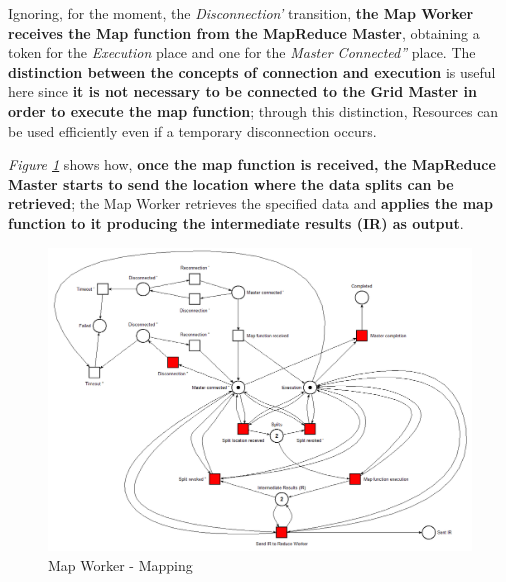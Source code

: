 Ignoring, for the moment, the \textit{Disconnection'} transition, \textbf{the Map Worker receives the Map function from the MapReduce Master}, obtaining a token for the \textit{Execution} place and one for the \textit{Master Connected''} place. The \textbf{distinction between the concepts of connection and execution} is useful here since \textbf{it is not necessary to be connected to the Grid Master in order to execute the map function}; through this distinction, Resources can be used efficiently even if a temporary disconnection occurs.

\textit{Figure \ref{fig:map_worker_petri_net_2}} shows how, \textbf{once the map function is received, the MapReduce Master starts to send the location where the data splits can be retrieved}; the Map Worker retrieves the specified data and \textbf{applies the map function to it producing the intermediate results (IR) as output}.

\vspace{5mm}

\begin{figure}[!ht]
    \centering
    \includegraphics[width=\linewidth]{document/chapters/chapter_5/images/map_worker_petri_net_2.png}
    \caption{Map Worker - Mapping}
    \label{fig:map_worker_petri_net_2}
\end{figure}


